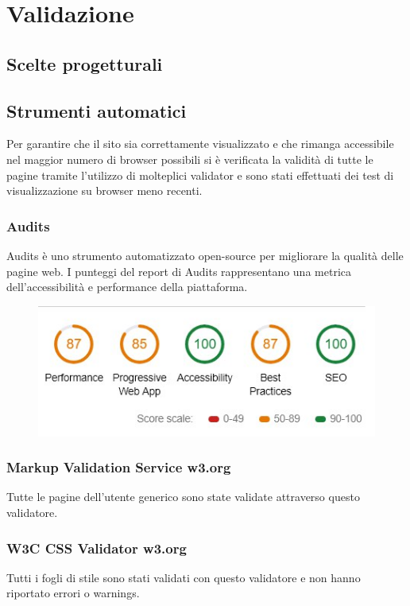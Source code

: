 
\section{Validazione}
 

\subsection{Scelte progetturali}

\subsection{Strumenti automatici}
Per garantire che il sito sia correttamente visualizzato e che rimanga accessibile nel maggior numero di browser possibili si è verificata la validità di tutte le pagine tramite l'utilizzo di molteplici validator e sono stati effettuati dei test di visualizzazione su browser meno recenti.


\subsubsection{Audits}
Audits è uno strumento automatizzato open-source per migliorare la qualità delle pagine web.
I punteggi del report di Audits rappresentano una metrica dell'accessibilità e performance della piattaforma.
\begin{figure}[H]
	\centerline{\includegraphics[scale= 0.65]{img/punteggiAudits.jpg}}

\end{figure}



\subsubsection{Markup Validation Service w3.org}
Tutte le pagine dell'utente generico sono state validate attraverso questo validatore. 

\subsubsection{W3C CSS Validator w3.org}
Tutti i fogli di stile sono stati validati con questo validatore e non hanno riportato errori o warnings.

